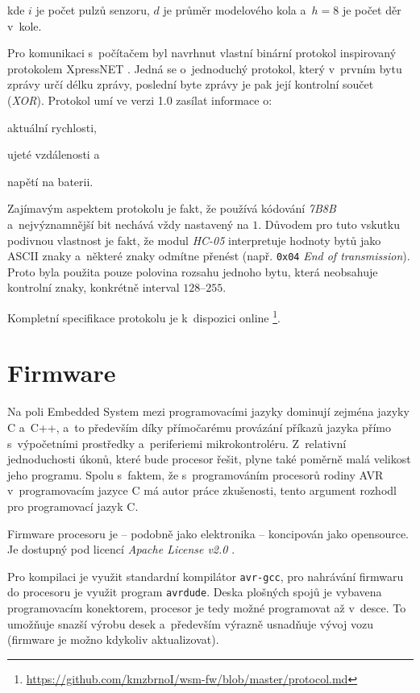 kde $i$ je počet pulzů senzoru, $d$ je průměr modelového kola a~$h = 8$ je
počet děr v~kole.

Pro komunikaci s~počítačem byl navrhnut vlastní binární protokol inspirovaný
protokolem XpressNET \cite{xpressnet-specs}. Jedná se o~jednoduchý protokol,
který v~prvním bytu zprávy určí délku zprávy, poslední byte zprávy je pak její
kontrolní součet (\textit{XOR}). Protokol umí ve verzi 1.0 zasílat informace o:

\begin{compactenum}
\item aktuální rychlosti,
\item ujeté vzdálenosti a
\item napětí na baterii.
\end{compactenum}

Zajímavým aspektem protokolu je fakt, že používá kódování \textit{7B8B}
a~nejvýznamnější bit nechává vždy nastavený na $1$. Důvodem pro tuto vskutku
podivnou vlastnost je fakt, že modul \textit{HC-05} interpretuje hodnoty bytů
jako ASCII znaky a~některé znaky odmítne přenést (např. \texttt{0x04}
\textit{End of transmission}). Proto byla použita pouze polovina rozsahu
jednoho bytu, která neobsahuje kontrolní znaky, konkrétně interval
$128$--$255$.

Kompletní specifikace protokolu je k~dispozici online
\footnote{\url{https://github.com/kmzbrnoI/wsm-fw/blob/master/protocol.md}}.

\section{Firmware}
\label{sec:wsm-fw}

Na poli Embedded System mezi programovacími jazyky dominují zejména jazyky C
a~C++, a~to především díky přímočarému provázání příkazů jazyka přímo
s~výpočetními prostředky a~periferiemi mikrokontroléru. Z~relativní
jednoduchosti úkonů, které bude procesor řešit, plyne také poměrně malá
velikost jeho programu. Spolu s~faktem, že s~programováním procesorů rodiny
AVR v~programovacím jazyce C má autor práce zkušenosti, tento argument rozhodl
pro programovací jazyk C.

Firmware procesoru je -- podobně jako elektronika -- koncipován jako
opensource. Je dostupný pod licencí \textit{Apache License v2.0} \cite{wsm-fw}.

Pro kompilaci je využit standardní kompilátor \texttt{avr-gcc}, pro nahrávání
firmwaru do procesoru je využit program \texttt{avrdude}. Deska
plošných spojů je vybavena programovacím konektorem, procesor je tedy možné
programovat až v~desce. To umožňuje snazší výrobu desek a~především výrazně
usnadňuje vývoj vozu (firmware je možno kdykoliv aktualizovat).

